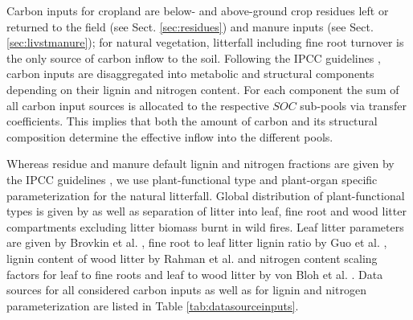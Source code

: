 \documentclass[gc, manuscript]{copernicus}
\begin{document}
Carbon inputs for cropland are below- and above-ground crop residues left or returned to the field (see Sect. \ref{sec:residues}) and manure inputs (see Sect. \ref{sec:livstmanure}); for natural vegetation, litterfall including fine root turnover \citep{schaphoff_lpjml4_2018} is the only source of carbon inflow to the soil. Following the IPCC guidelines \citep{ogle_cropland_in_ipcc_2019}, carbon inputs are disaggregated into metabolic and structural components depending on their lignin and nitrogen content. For each component the sum of all carbon input sources is allocated to the respective \(SOC\) sub-pools via transfer coefficients. This implies that both the amount of carbon and its structural composition determine the effective inflow into the different pools.

Whereas residue and manure default lignin and nitrogen fractions are given by the IPCC guidelines \citep{ogle_cropland_in_ipcc_2019}, we use plant-functional type and plant-organ specific parameterization for the natural litterfall. Global distribution of plant-functional types is given by \citep{schaphoff_lpjml4_2018} as well as separation of litter into leaf, fine root and wood litter compartments excluding litter biomass burnt in wild fires. Leaf litter parameters are given by Brovkin et al. \citeyearpar{brovkin_plant-driven_2012}, fine root to leaf litter lignin ratio by Guo et al. \citeyearpar{guo_leaf_root_decompostion_2021}, lignin content of wood litter by Rahman et al. \citeyearpar{rahman_lignin_2013} and nitrogen content scaling factors for leaf to fine roots and leaf to wood litter by von Bloh et al. \citeyearpar{vBloh_lpjml5_2018}.
Data sources for all considered carbon inputs as well as for lignin and nitrogen parameterization are listed in Table \ref{tab:datasourceinputs}.
\end{document}
